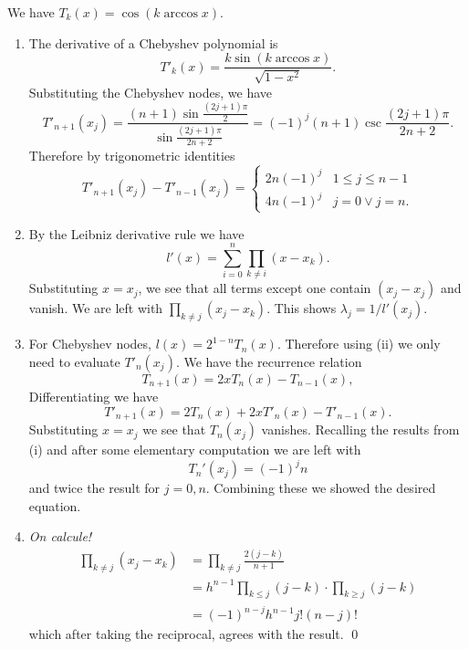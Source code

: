 \documentclass{homework}
\begin{document}
\begin{problem} We have \(T_k(x) = \cos (k\arccos x)\).
\begin{enumerate}[label=(\roman*)]
\item The derivative of a Chebyshev polynomial is
\[T'_k(x) = \frac{k\sin(k\arccos x)}{\sqrt{1-x^2}}.\] Substituting the Chebyshev nodes, we have
\[T'_{n+1}(x_j) = \frac{(n+1)\sin \frac{ (2j+1)\pi}{2}}{\sin\frac{(2j+1)\pi}{2n+2}} = (-1)^{j}(n+1)\csc\frac{(2j+1)\pi}{2n+2}.\]
Therefore by trigonometric identities
\[T'_{n+1}(x_j) - T'_{n-1}(x_j) = \begin{cases}
2n(-1)^j & 1 \le j \le n-1\\
4n(-1)^j & j = 0 \lor j = n.
\end{cases}\]
\item By the Leibniz derivative rule we have
\[l'(x) = \sum_{i=0}^n \prod_{k\ne i} (x - x_k).\]
Substituting \(x = x_j\), we see that all terms except one contain \((x_j - x_j)\) and vanish. We are left with \(\prod_{k\ne j} (x_j - x_k)\). This shows \(\lambda_j = 1/l'(x_j)\).
\item For Chebyshev nodes, \(l(x) = 2^{1-n}T_n(x)\). Therefore using (ii) we only need to evaluate \(T'_n(x_j)\). We have the recurrence relation
\[T_{n+1}(x) = 2xT_n(x) - T_{n-1}(x),\]
Differentiating we have
\[T'_{n+1}(x) = 2T_n(x) + 2xT'_n(x) - T'_{n-1}(x).\]
Substituting \(x = x_j\) we see that \(T_n(x_j)\) vanishes. Recalling the results from (i) and after some elementary computation we are left with
\[T_n'(x_j) = (-1)^{j}n\]
and twice the result for \(j = 0, n\). Combining these we showed the desired equation.
\item \emph{On calcule!}
\[\begin{aligned}
\prod_{k\ne j} (x_j - x_k)
&= \prod_{k\ne j} \frac{2(j-k)}{n+1}\\
&= h^{n-1}\prod_{k \le j} (j-k) \cdot \prod_{k\ge j} (j-k)\\
&= (-1)^{n-j} h^{n-1} j! (n-j)!
\end{aligned}\]
which after taking the reciprocal, agrees with the result. \qed
\end{enumerate}
\renewcommand{\qed}{}
\end{problem}
\end{document}
